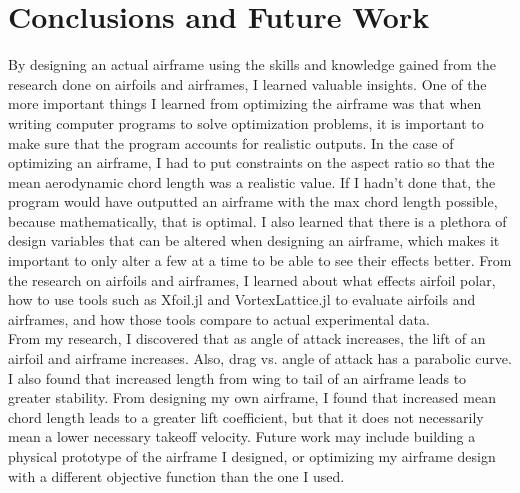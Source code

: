 \documentclass[journal]{new-aiaa}
\begin{document}
	
	
	
	
	\section{Conclusions and Future Work}
	\label{sec:conclusions}
	
	By designing an actual airframe using the skills and knowledge gained from the research done on airfoils and airframes, I learned valuable insights. One of the more important things I learned from optimizing the airframe was that when writing computer programs to solve optimization problems, it is important to make sure that the program accounts for realistic outputs. In the case of optimizing an airframe, I had to put constraints on the aspect ratio so that the mean aerodynamic chord length was a realistic value. If I hadn't done that, the program would have outputted an airframe with the max chord length possible, because mathematically, that is optimal. I also learned that there is a plethora of design variables that can be altered when designing an airframe, which makes it important to only alter a few at a time to be able to see their effects better. From the research on airfoils and airframes, I learned about what effects airfoil polar, how to use tools such as Xfoil.jl \cite{McDonnell} and VortexLattice.jl \cite{McDonnell-Ning} to evaluate airfoils and airframes, and how those tools compare to actual experimental data.\\
	
	From my research, I discovered that as angle of attack increases, the lift of an airfoil and airframe increases. Also, drag vs. angle of attack has a parabolic curve. I also found that increased length from wing to tail of an airframe leads to greater stability. From designing my own airframe, I found that increased mean chord length leads to a greater lift coefficient, but that it does not necessarily mean a lower necessary takeoff velocity. Future work may include building a physical prototype of the airframe I designed, or optimizing my airframe design with a different objective function than the one I used.\\
	
\end{document}
